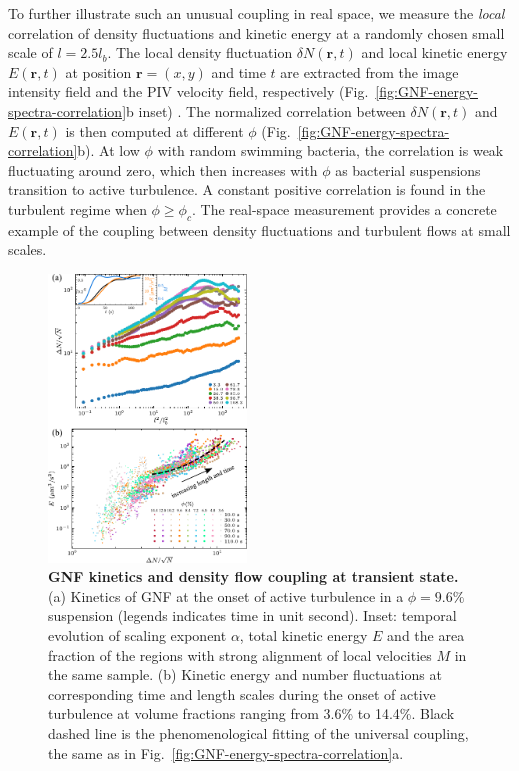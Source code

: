 \documentclass[twocolumn,aps,prx,amsmath,amssymb,longbibliography]{revtex4-2}
\begin{document}
To further illustrate such an unusual coupling in real space, we measure the \emph{local} correlation of density fluctuations and kinetic energy at a randomly chosen small scale of $l = 2.5l_b$. The local density fluctuation $\delta N(\mathbf{r},t)$ and local kinetic energy $E(\mathbf{r},t)$ at position $\mathbf{r} = (x,y)$ and time $t$ are extracted from the image intensity field and the PIV velocity field, respectively (Fig.~\ref{fig:GNF-energy-spectra-correlation}b inset) \cite{Liu2020}.
The normalized correlation between $\delta N(\mathbf{r},t)$ and $E(\mathbf{r},t)$ is then computed at different $\phi$ (Fig.~\ref{fig:GNF-energy-spectra-correlation}b). At low $\phi$ with random swimming bacteria, the correlation is weak fluctuating around zero, which then increases with $\phi$ as bacterial suspensions transition to active turbulence. A constant positive correlation is found in the turbulent regime when $\phi \geq \phi_c$. The real-space measurement provides a concrete example of the coupling between density fluctuations and turbulent flows at small scales.

\begin{figure}[!]
\begin{center}
\includegraphics[width=0.47\textwidth]{figures/GNF-energy-spectra-correlation-transient/v3.pdf}
\caption[The correlation between GNF and kinetic energy and kinetic energy spectra at transient state]
{
\textbf{GNF kinetics and density flow coupling at transient state.}
(a) Kinetics of GNF at the onset of active turbulence in a $\phi=9.6\%$ suspension (legends indicates time in unit second). Inset: temporal evolution of scaling exponent $\alpha$, total kinetic energy $E$ and the area fraction of the regions with strong alignment of local velocities $M$ in the same sample.
(b) Kinetic energy and number fluctuations at corresponding time and length scales during the onset of active turbulence at volume fractions ranging from 3.6\% to 14.4\%. Black dashed line is the phenomenological fitting of the universal coupling, the same as in Fig.~\ref{fig:GNF-energy-spectra-correlation}a.
}
\label{fig:GNF-energy-spectra-correlation-transient}
\end{center}
\end{figure}
\end{document}
